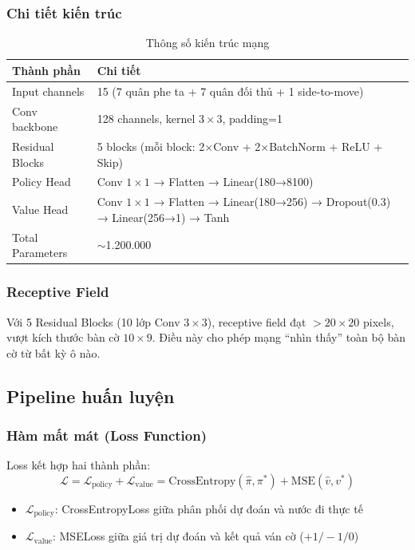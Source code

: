 \subsubsection{Chi tiết kiến trúc}
\begin{table}[H]
\centering
\caption{Thông số kiến trúc mạng}
\begin{tabular}{ll}
\toprule
\textbf{Thành phần} & \textbf{Chi tiết} \\
\midrule
Input channels & 15 (7 quân phe ta + 7 quân đối thủ + 1 side-to-move) \\
Conv backbone & 128 channels, kernel $3 \times 3$, padding=1 \\
Residual Blocks & 5 blocks (mỗi block: 2×Conv + 2×BatchNorm + ReLU + Skip) \\
Policy Head & Conv $1\times1$ → Flatten → Linear(180→8100) \\
Value Head & Conv $1\times1$ → Flatten → Linear(180→256) → Dropout(0.3) → Linear(256→1) → Tanh \\
Total Parameters & $\sim$1.200.000 \\
\bottomrule
\end{tabular}
\end{table}

\subsubsection{Receptive Field}
Với 5 Residual Blocks (10 lớp Conv $3 \times 3$), receptive field đạt $> 20 \times 20$ pixels, vượt kích thước bàn cờ $10 \times 9$. Điều này cho phép mạng ``nhìn thấy'' toàn bộ bàn cờ từ bất kỳ ô nào.

\subsection{Pipeline huấn luyện}

\subsubsection{Hàm mất mát (Loss Function)}
Loss kết hợp hai thành phần:
\begin{equation}
    \mathcal{L} = \mathcal{L}_{\text{policy}} + \mathcal{L}_{\text{value}} = \text{CrossEntropy}(\hat{\pi}, \pi^*) + \text{MSE}(\hat{v}, v^*)
\end{equation}
\begin{itemize}
    \item $\mathcal{L}_{\text{policy}}$: CrossEntropyLoss giữa phân phối dự đoán và nước đi thực tế
    \item $\mathcal{L}_{\text{value}}$: MSELoss giữa giá trị dự đoán và kết quả ván cờ ($+1/-1/0$)
\end{itemize}

